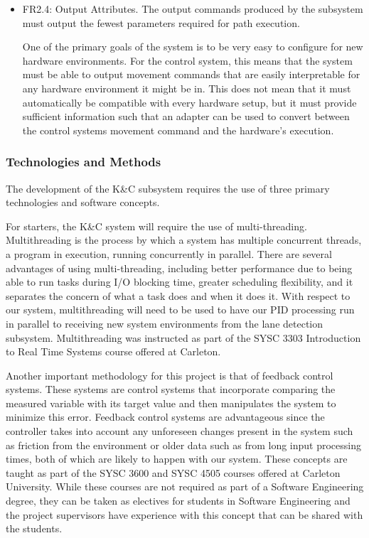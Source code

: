 \documentclass[titlepage,draft]{article}
\begin{document}
{\begin{itemize}
	      Therefore, it is important for our system to use as much closed loop properties as possible, and only rely on open loop properties when the latest data is not available.

	\item FR2.4: Output Attributes. The output commands produced by the subsystem must output the fewest parameters required for path execution.

	      One of the primary goals of the system is to be very easy to configure for new hardware environments. For the control system, this means that the system must be able to output movement commands that are easily interpretable for any hardware environment it might be in. This does not mean that it must automatically be compatible with every hardware setup, but it must provide sufficient information such that an adapter can be used to convert between the control systems movement command and the hardware's execution.
\end{itemize}


\subsubsection{Technologies and Methods}
The development of the K\&C subsystem requires the use of three primary technologies and software concepts.

For starters, the K\&C system will require the use of multi-threading. Multithreading is the process by which a system has multiple concurrent threads, a program in execution, running concurrently in parallel. There are several advantages of using multi-threading, including better performance due to being able to run tasks during I/O blocking time, greater scheduling flexibility, and it separates the concern of what a task does and when it does it. With respect to our system, multithreading will need to be used to have our PID processing run in parallel to receiving new system environments from the lane detection subsystem. Multithreading was instructed as part of the SYSC 3303 Introduction to Real Time Systems course offered at Carleton.

Another important methodology for this project is that of feedback control systems. These systems are control systems that incorporate comparing the measured variable with its target value and then manipulates the system to minimize this error\cite{intro_to_feedback_sys}. Feedback control systems are advantageous since the controller takes into account any unforeseen changes present in the system such as friction from the environment or older data such as from long input processing times, both of which are likely to happen with our system\cite{intro_to_feedback_sys}. These concepts are taught as part of the SYSC 3600 and SYSC 4505 courses offered at Carleton University. While these courses are not required as part of a Software Engineering degree, they can be taken as electives for students in Software Engineering and the project supervisors have experience with this concept that can be shared with the students.

}
\end{document}

